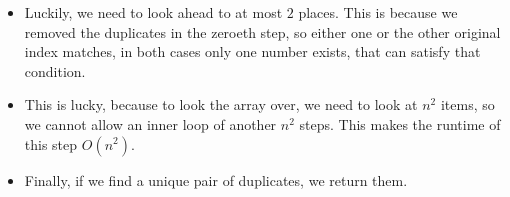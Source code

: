 \begin{itemize}
    \item Luckily, we need to look ahead to at most $2$ places. This is because we removed the duplicates in the zeroeth step, so either one or the other original index matches, in both cases only one number exists, that can satisfy that condition.
    \item This is lucky, because to look the array over, we need to look at $n^2$ items, so we cannot allow an inner loop of another $n^2$ steps. This makes the runtime of this step $O(n^2)$.
    \item Finally, if we find a unique pair of duplicates, we return them.
\end{itemize}